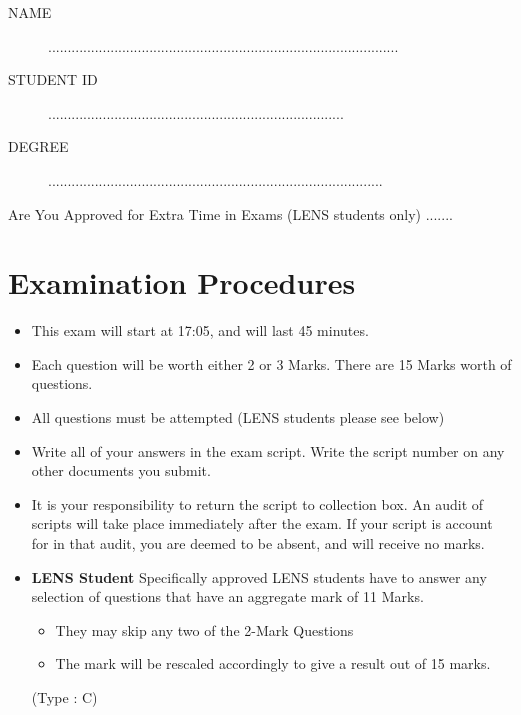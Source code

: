 \documentclass[11pt]{article} %
\begin{document}
	
	
	\Large
\newpage

\begin{framed}
\begin{description}
\item[NAME]  ..........................................................................................
\bigskip
\item[STUDENT ID] ............................................................................
\bigskip
\item[DEGREE] ......................................................................................
\end{description}
\end{framed}
\noindent Are You Approved for Extra Time in Exams (LENS students only)  .......
\section*{Examination Procedures}

\begin{itemize} 
	\item This exam will start at 17:05, and will last 45 minutes.
	
	\item Each question will be worth either 2 or 3 Marks. There are 15 Marks worth of questions.
	\item All questions must be attempted (LENS students please see below)
	
	\item Write all of your answers in the exam script. Write the script number on any other documents you submit.
	
	\item It is your responsibility to return the script to collection box. An audit of scripts will take place immediately after the exam. If your script is account for in that audit,  you are deemed to be absent, and will receive no marks.
	
	\item \textbf{LENS Student}
	Specifically approved LENS students have to answer any selection of questions that have an aggregate mark of 11 Marks.  
	\begin{itemize}
		\item They may skip any two of the 2-Mark Questions
		\item The mark will be rescaled accordingly to give a result out of 15 marks.
	\end{itemize}
(Type : C)	
	
\end{itemize}
\end{document}
